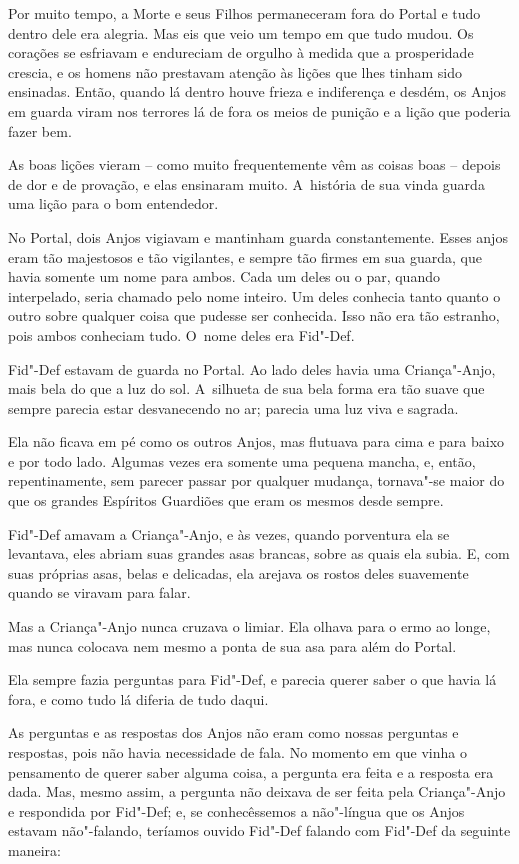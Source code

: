 Por muito tempo, a Morte e seus Filhos permaneceram fora do Portal e
tudo dentro dele era alegria. Mas eis que veio um tempo em que tudo
mudou. Os corações se esfriavam e endureciam de orgulho à medida que a
prosperidade crescia, e os homens não prestavam atenção às lições que
lhes tinham sido ensinadas. Então, quando lá dentro houve frieza e
indiferença e desdém, os Anjos em guarda viram nos terrores lá de fora
os meios de punição e a lição que poderia fazer bem.

As boas lições vieram -- como muito frequentemente vêm as coisas boas --
depois de dor e de provação, e elas ensinaram muito. A~história de sua
vinda guarda uma lição para o bom entendedor.

No Portal, dois Anjos vigiavam e mantinham guarda constantemente. Esses
anjos eram tão majestosos e tão vigilantes, e sempre tão firmes em sua
guarda, que havia somente um nome para ambos. Cada um deles ou o par,
quando interpelado, seria chamado pelo nome inteiro. Um deles conhecia
tanto quanto o outro sobre qualquer coisa que pudesse ser conhecida.
Isso não era tão estranho, pois ambos conheciam tudo. O~nome deles era
Fid"-Def.

Fid"-Def estavam de guarda no Portal. Ao lado deles havia uma
Criança"-Anjo, mais bela do que a luz do sol. A~silhueta de sua bela
forma era tão suave que sempre parecia estar desvanecendo no ar; parecia
uma luz viva e sagrada.

Ela não ficava em pé como os outros Anjos, mas flutuava para cima e para
baixo e por todo lado. Algumas vezes era somente uma pequena mancha, e,
então, repentinamente, sem parecer passar por qualquer mudança,
tornava"-se maior do que os grandes Espíritos Guardiões que eram os
mesmos desde sempre.

Fid"-Def amavam a Criança"-Anjo, e às vezes, quando porventura ela se
levantava, eles abriam suas grandes asas brancas, sobre as quais ela
subia. E, com suas próprias asas, belas e delicadas, ela arejava os
rostos deles suavemente quando se viravam para falar.

Mas a Criança"-Anjo nunca cruzava o limiar. Ela olhava para o ermo ao
longe, mas nunca colocava nem mesmo a ponta de sua asa para além do
Portal.

Ela sempre fazia perguntas para Fid"-Def, e parecia querer saber o que
havia lá fora, e como tudo lá diferia de tudo daqui.

As perguntas e as respostas dos Anjos não eram como nossas perguntas e
respostas, pois não havia necessidade de fala. No momento em que vinha o
pensamento de querer saber alguma coisa, a pergunta era feita e a
resposta era dada. Mas, mesmo assim, a pergunta não deixava de ser feita
pela Criança"-Anjo e respondida por Fid"-Def; e, se conhecêssemos a
não"-língua que os Anjos estavam não"-falando, teríamos ouvido Fid"-Def
falando com Fid"-Def da seguinte maneira:


